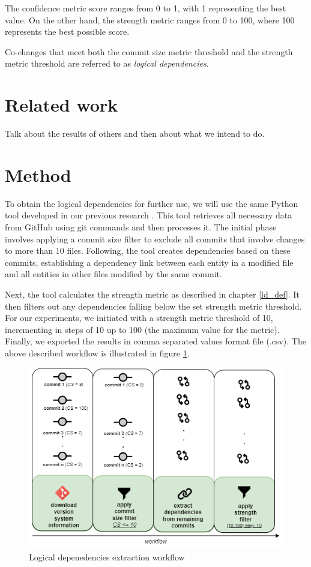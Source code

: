 \documentclass[conference]{IEEEtran}
\begin{document}
The confidence metric score ranges from 0 to 1, with 1 representing the best value. On the other hand, the strength metric ranges from 0 to 100, where 100 represents the best possible score.

Co-changes that meet both the commit size metric threshold and the strength metric threshold are referred to as \textit{logical dependencies}.

\section{Related work}

Talk about the results of others and then about what we intend to do.


\section{Method}
\label{method}

To obtain the logical dependencies for further use, we will use the same Python tool developed in our previous research \cite{articlekeyclass23}. This tool retrieves all necessary data from GitHub \cite{ApacheAntGitHub} using git commands and then processes it. 
The initial phase involves applying a commit size filter to exclude all commits that involve changes to more than 10 files. Following, the tool creates dependencies based on these commits, establishing a dependency link between each entity in a modified file and all entities in other files modified by the same commit. 

Next, the tool calculates the strength metric as described in chapter \ref{ld_def}. It then filters out any dependencies falling below the set strength metric threshold. For our experiments, we initiated with a strength metric threshold of 10, incrementing in steps of 10 up to 100 (the maximum value for the metric). Finally, we exported the results in comma separated values format file (.csv). The above described workflow is illustrated in figure \ref{fig:extraction}.


\begin{figure}
\centering
\includegraphics[width=\columnwidth]{dependencies-export.png}
\caption{Logical depenedencies extraction workflow}
\label{fig:extraction}
\centering
\end{figure}
\end{document}
